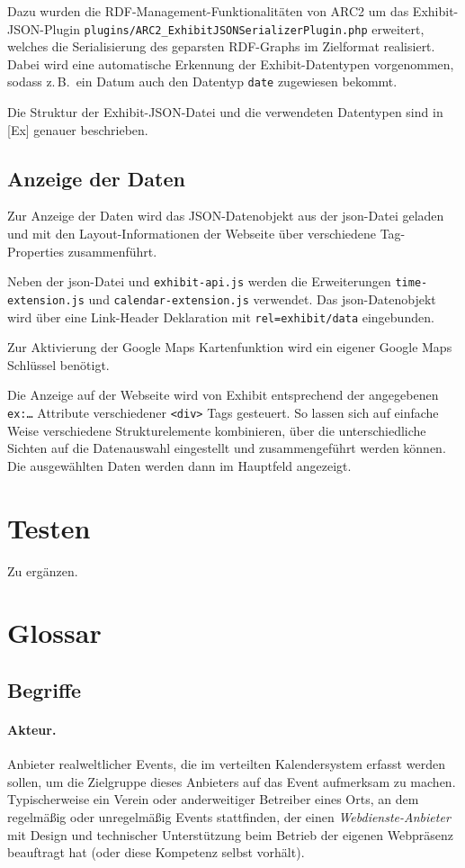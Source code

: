 \documentclass[11pt,a4paper]{article}
\begin{document}
Dazu wurden die RDF-Management-Funktionalitäten von ARC2 um das
Exhibit-JSON-Plug\-in \texttt{plugins/ARC2\_ExhibitJSONSerializerPlugin.php}
erweitert, welches die Serialisierung des geparsten RDF-Graphs im Zielformat
realisiert.  Dabei wird eine automatische Erkennung der Exhibit-Datentypen
vorgenommen, sodass z.\,B.\ ein Datum auch den Datentyp \texttt{date}
zugewiesen bekommt.

Die Struktur der Exhibit-JSON-Datei und die verwendeten Datentypen sind in
[Ex] genauer beschrieben.

\subsection{Anzeige der Daten}

Zur Anzeige der Daten wird das JSON-Datenobjekt aus der json-Datei geladen und
mit den Layout-Informationen der Webseite über verschiedene Tag-Properties
zusammenführt.

Neben der json-Datei und \texttt{exhibit-api.js} werden die Erweiterungen
\texttt{time-extension.js} und \texttt{calendar-extension.js} verwendet.
Das json-Datenobjekt wird über eine Link-Header Deklaration mit
\texttt{rel={\dq}exhibit/data{\dq}} eingebunden. 

Zur Aktivierung der Google Maps Kartenfunktion wird ein eigener Google Maps
Schlüssel benötigt. 

Die Anzeige auf der Webseite wird von Exhibit entsprechend der angegebenen
\texttt{ex:\ldots} Attribute verschiedener \texttt{<div>} Tags gesteuert.  So
lassen sich auf einfache Weise verschiedene Strukturelemente kombinieren, über
die unterschiedliche Sichten auf die Datenauswahl eingestellt und
zusammengeführt werden können.  Die ausgewählten Daten werden dann im
Hauptfeld angezeigt. 

\section{Testen}

Zu ergänzen.

\section{Glossar}

\subsection{Begriffe}

\paragraph{Akteur.} 
Anbieter realweltlicher Events, die im verteilten Kalendersystem erfasst
werden sollen, um die Zielgruppe dieses Anbieters auf das Event aufmerksam zu
machen.  Typischerweise ein Verein oder anderweitiger Betreiber eines Orts, an
dem regelmäßig oder unregelmäßig Events stattfinden, der einen
\emph{Webdienste-Anbieter} mit Design und technischer Unterstüt\-zung beim
Betrieb der eigenen Webpräsenz beauftragt hat (oder diese Kompetenz selbst
vorhält).
\end{document}
